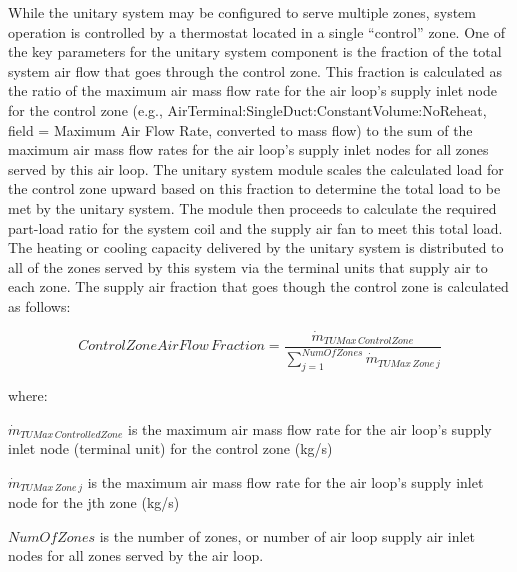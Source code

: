 While the unitary system may be configured to serve multiple zones, system operation is controlled by a thermostat located in a single ``control'' zone. One of the key parameters for the unitary system component is the fraction of the total system air flow that goes through the control zone. This fraction is calculated as the ratio of the maximum air mass flow rate for the air loop's supply inlet node for the control zone (e.g., AirTerminal:SingleDuct:ConstantVolume:NoReheat, field = Maximum Air Flow Rate, converted to mass flow) to the sum of the maximum air mass flow rates for the air loop's supply inlet nodes for all zones served by this air loop. The unitary system module scales the calculated load for the control zone upward based on this fraction to determine the total load to be met by the unitary system. The module then proceeds to calculate the required part-load ratio for the system coil and the supply air fan to meet this total load. The heating or cooling capacity delivered by the unitary system is distributed to all of the zones served by this system via the terminal units that supply air to each zone. The supply air fraction that goes though the control zone is calculated as follows:

\begin{equation}
Control Zone Air Flow\,Fraction = \frac{{{{\dot m}_{TUMax\,ControlZone}}}}{{\sum\limits_{j = 1}^{NumOfZones} {{{\dot m}_{TUMax\,Zone\,j}}} }}
\end{equation}

where:

\({\dot m_{TUMax\,ControlledZone}}\) is the maximum air mass flow rate for the air loop's supply inlet node (terminal unit) for the control zone (kg/s)

\({\dot m_{TUMax\,Zone\,j}}\) is the maximum air mass flow rate for the air loop's supply inlet node for the jth zone (kg/s)

\(NumOfZones\) is the number of zones, or number of air loop supply air inlet nodes for all zones served by the air loop.

